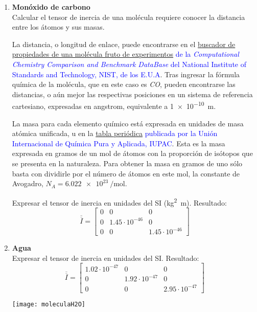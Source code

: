 \documentclass[11pt, spanish, a4paper, twoside]{article}
\begin{document}
\begin{enumerate}
	\item
	\textbf{Monóxido de carbono}\\
	Calcular el tensor de inercia de una molécula requiere conocer la distancia entre los átomos y sus masas.

	La distancia, o longitud de enlace, puede encontrarse en el \textcolor{blue}{\href{https://cccbdb.nist.gov/exp1x.asp}{buscador de propiedades de una molécula fruto de experimentos} de la \emph{Computational Chemistry Comparison and Benchmark DataBase} del National Institute of Standards and Technology, NIST, de los E.U.A}.
	Tras ingresar la fórmula química de la molécula, que en este caso es \emph{CO}, pueden encontrarse las distancias, o aún mejor las respectivas posiciones en un sistema de referencia cartesiano, expresadas en \si{angstrom}, equivalente a \SI{1e-10}{\metre}.

	La masa para cada elemento químico está expresada en unidades de masa atómica unificada, \si{\atomicmassunit} en la \textcolor{blue}{\href{https://iupac.org/what-we-do/periodic-table-of-elements/}{tabla periódica} publicada por la Unión Internacional de Química Pura y Aplicada, IUPAC}.
	Esta es la masa expresada en gramos de un mol de átomos con la proporción de isótopos que se presenta en la naturaleza.
	Para obtener la masa en gramos de uno sólo basta con dividirle por el número de átomos en este mol, la constante de Avogadro, \(N_A = \SI{6.022e23}{\per\mole}\).
	
	Expresar el tensor de inercia en unidades del SI (\si{\kilogram \squared \metre}).
	Resultado:\\
	\[
		\overline{\overline{I}} = \left[\begin{matrix}0 & 0 & 0\\0 & 1.45 \cdot 10^{-46} & 0\\0 & 0 & 1.45 \cdot 10^{-46}\end{matrix}\right]
	\]



	\item 
	\begin{minipage}[t][3cm]{0.73\textwidth}
	\textbf{Agua}\\
		Expresar el tensor de inercia en unidades del SI.
		Resultado:\\
		\[
			\overline{\overline{I}} = \left[\begin{matrix}1.02 \cdot 10^{-47} & 0 & 0\\0 & 1.92 \cdot 10^{-47} & 0\\0 & 0 & 2.95 \cdot 10^{-47}\end{matrix}\right]
		\]
	\end{minipage}
	\begin{minipage}[c][1cm][t]{0.2\textwidth}
		\texttt{[image: moleculaH2O]}
	\end{minipage}


\end{enumerate}
\end{document}

